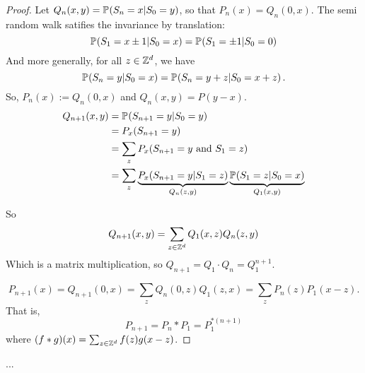     \begin{proof}
        Let $Q_n(x, y) = \P{S_n = x | S_0 = y}$, so that $P_n(x) = Q_n(0, x)$.
        The semi random walk satifies the invariance by translation:
        \[
            \P{S_1 = x \pm 1 | S_0 = x}
            = 
            \P{S_1 = \pm 1 | S_0 = 0}
        \]
        And more generally, for all $z \in \Z^d$, we have
        \[
            \Pcond{S_n = y}{S_0 = x}
            = 
            \Pcond{S_n = y + z}{S_0 = x + z}.
        \]
        So, $P_n(x) := Q_n(0, x)$ and $Q_n(x, y) = P(y - x)$.
        \begin{align*}
            Q_{n + 1}(x, y) 
            &= 
            \Pcond{S_{n+1} = y}{S_0 = y}
            \\&=
            P_x(S_{n+1} = y)
            \\ &= 
            \sum_z P_x(S_{n+1} = y \andd S_1 = z)
            \\&=
            \sum_z \underbrace{
                P_x(S_{n+1} = y | S_1 = z) 
            }_{Q_n(z, y)}
            \underbrace{
                \Pcond{S_1 = z}{S_0 = x}
            }_{Q_1(x, y)}
        \end{align*}

        So \[
            Q_{n+1}(x, y) = \sum_{z \in \Z^d}
                Q_1(x, z) Q_n(z, y)
        \]  %
        Which is a matrix multiplication, 
        so $Q_{n+1} = Q_1 \cdot Q_n = Q_1^{n+1}$.

        \[
            P_{n+1}(x) = Q_{n+1}(0, x) = 
            \sum_z Q_n(0, z) Q_1(z, x)
            = \sum_z P_n(z) P_1(x - z).
        \]
        That is, 
        \[
            P_{n+1} = P_n * P_1 = P_1^{*(n+1)}
        \]
        where $(f * g)(x) = \sum_{z \in \Z^d} f(z)g(x - z)$.
    \end{proof}

    \begin{claim}
        ...
    \end{claim}


